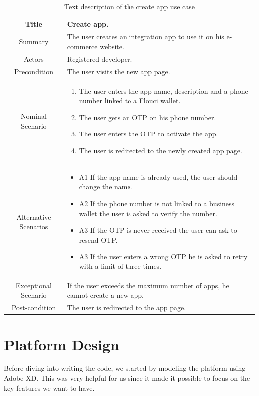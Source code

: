 \begin{spacing}{1.2}
\begin{table}[H]
\centering
\caption{Text description of the create app use case}
\begin{tabularx}{\linewidth}{|c|X|}
\hline
Title & Create app.  \\ \hline
Summary & The user creates an integration app to use it on his e-commerce website. \\ \hline
Actors & Registered developer. \\ \hline
Precondition & The user visits the new app page. \\ \hline
Nominal Scenario & \begin{enumerate}
 \item The user enters the app name, description and a phone number linked to a Flouci wallet.
 \item The user gets an OTP on his phone number.
 \item The user enters the OTP to activate the app.
 \item The user is redirected to the newly created app page.
 \end{enumerate}
 \\ \hline
Alternative Scenarios & \begin{itemize}
	\item A1 If the app name is already used, the user should change the name.
	\item A2 If the phone number is not linked to a business wallet the user is asked to verify the number.
	\item A3 If the OTP is never received the user can ask to resend OTP.
	\item A3 If the user enters a wrong OTP he is asked to retry with a limit of three times.
\end{itemize} \\ \hline
Exceptional Scenario & If the user exceeds the maximum number of apps, he cannot create a new app. \\ \hline
Post-condition & The user is redirected to the app page. \\ \hline
\end{tabularx}
\label{apptable}
\end{table}

\section{Platform Design}
Before diving into writing the code, we started by modeling the platform using Adobe XD. This was very helpful for us since it made it possible to focus on the key features we want to have.


\end{spacing}
